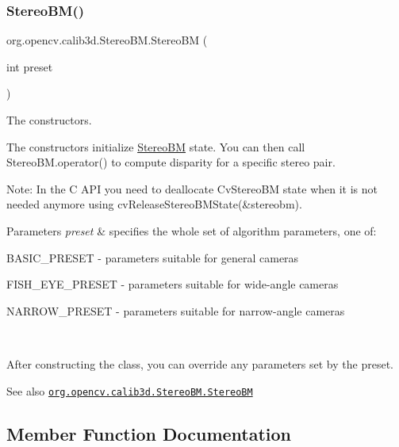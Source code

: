 \subsubsection{\texorpdfstring{Stereo\+B\+M()}{StereoBM()}\hspace{0.1cm}{\footnotesize\ttfamily [4/4]}}
{\footnotesize\ttfamily org.\+opencv.\+calib3d.\+Stereo\+B\+M.\+Stereo\+BM (\begin{DoxyParamCaption}\item[{int}]{preset }\end{DoxyParamCaption})}

The constructors.

The constructors initialize {\ttfamily \mbox{\hyperlink{classorg_1_1opencv_1_1calib3d_1_1_stereo_b_m}{Stereo\+BM}}} state. You can then call {\ttfamily Stereo\+B\+M.\+operator()} to compute disparity for a specific stereo pair.

Note\+: In the C A\+PI you need to deallocate {\ttfamily Cv\+Stereo\+BM} state when it is not needed anymore using {\ttfamily cv\+Release\+Stereo\+B\+M\+State(\&stereobm)}.


\begin{DoxyParams}{Parameters}
{\em preset} & specifies the whole set of algorithm parameters, one of\+: 
\begin{DoxyItemize}
\item B\+A\+S\+I\+C\+\_\+\+P\+R\+E\+S\+ET -\/ parameters suitable for general cameras 
\item F\+I\+S\+H\+\_\+\+E\+Y\+E\+\_\+\+P\+R\+E\+S\+ET -\/ parameters suitable for wide-\/angle cameras 
\item N\+A\+R\+R\+O\+W\+\_\+\+P\+R\+E\+S\+ET -\/ parameters suitable for narrow-\/angle cameras 
\end{DoxyItemize}\\
\hline
\end{DoxyParams}


After constructing the class, you can override any parameters set by the preset.

\begin{DoxySeeAlso}{See also}
\href{http://docs.opencv.org/modules/calib3d/doc/camera_calibration_and_3d_reconstruction.html#stereobm-stereobm}{\tt org.\+opencv.\+calib3d.\+Stereo\+B\+M.\+Stereo\+BM} 
\end{DoxySeeAlso}


\subsection{Member Function Documentation}
\mbox{\label{classorg_1_1opencv_1_1calib3d_1_1_stereo_b_m_a5d60b89080ccec2d781e2b1e4c3b5571}} 
